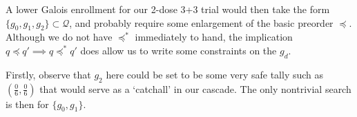 \documentclass{article}
\begin{document}
\newpage
A lower Galois enrollment for our 2-dose \mbox{3+3} trial would then take the form $\{g_0, g_1, g_2\} \subset \mathcal{Q}$, and probably require some enlargement of the basic preorder $\preceq$.  Although we do not have $\preceq^*\!$ immediately to hand, the implication $q \preceq q' \implies q \preceq^*\! q'$ does allow us to write some constraints on the $g_d$.

Firstly, observe that $g_2$ here could be set to be some very safe tally such as $(\frac{0}{6},\frac{0}{6})$ that would serve as a `catchall' in our cascade.  The only nontrivial search is then for $\{g_0, g_1\}$.



\end{document}
